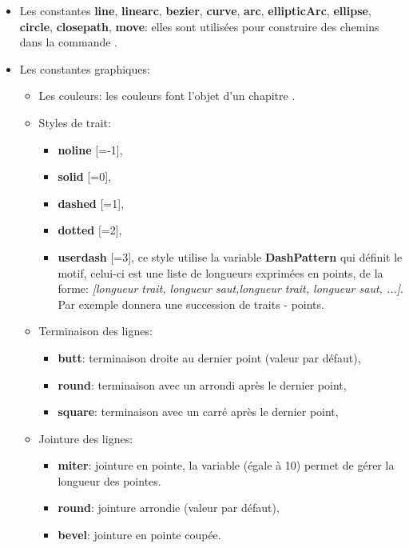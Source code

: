 \begin{itemize}
\item Les constantes \textbf{line}, \textbf{linearc}, \textbf{bezier}, \textbf{curve}, \textbf{arc}, \textbf{ellipticArc}, \textbf{ellipse}, \textbf{circle}, \textbf{closepath}, \textbf{move}: elles sont utilisées pour construire des chemins dans la commande .

\item Les constantes graphiques:

    \begin{itemize}
    \item Les couleurs: les couleurs font l'objet d'un chapitre .

    \item Styles de trait:
        \begin{itemize}
        \item \textbf{noline} [=-1],
            \item \textbf{solid} [=0],
            \item \textbf{dashed} [=1],
            \item \textbf{dotted} [=2],
        \item \textbf{userdash} [=3], ce style utilise la variable \textbf{DashPattern} qui définit le motif, celui-ci est une liste de longueurs exprimées en points, de la forme: \textsl{[longueur trait, longueur saut,longueur trait, longueur saut, ...]}. Par exemple  donnera une succession de traits - points.
        \end{itemize}
    \item Terminaison des lignes: 
        \begin{itemize}
        \item \textbf{butt}: terminaison droite au dernier point (valeur par défaut),
        \item \textbf{round}: terminaison avec un arrondi après le dernier point,
        \item \textbf{square}: terminaison avec un carré après le dernier point,
        \end{itemize}

    \item Jointure des lignes:
        \begin{itemize}
        \item \textbf{miter}: jointure en pointe, la variable  (égale à 10) permet de gérer la longueur des pointes.
        \item \textbf{round}: jointure arrondie (valeur par défaut),
        \item \textbf{bevel}: jointure en pointe coupée. 
        \end{itemize}


\end{itemize}
\end{itemize}
